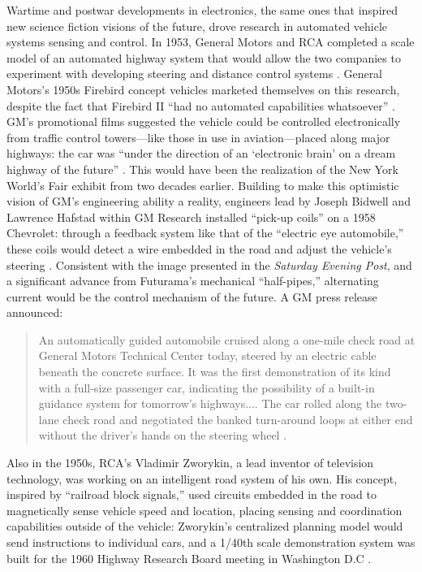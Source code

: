 Wartime and postwar developments in electronics, the same ones that
inspired new science fiction visions of the future, drove
research in automated vehicle systems sensing and control. In 1953, General
Motors and RCA completed a scale model of an automated highway system
that would allow the two companies to experiment
with developing steering and distance control systems \cite[p. 6]{wetmore}.
General Motors's 1950s Firebird concept
vehicles marketed themselves on this research, despite the fact that
Firebird II ``had no automated capabilities whatsoever'' \cite[p. 7]{wetmore}. GM's
promotional films suggested the vehicle could be controlled
electronically from traffic control towers---like those in use in
aviation---placed along major highways: the car was ``under the direction
of an `electronic brain' on a dream highway of the future'' \cite[p.
  7]{wetmore}. This 
would have been the realization of the New York World's Fair exhibit
from two decades earlier. Building to make
this optimistic vision of GM's engineering ability a reality,
engineers lead by Joseph Bidwell and Lawrence Hafstad within GM
Research installed ``pick-up coils'' on a 1958 Chevrolet: through a
feedback system like that of the ``electric eye automobile,'' these
coils would detect a wire embedded in the road and adjust the
vehicle's steering \cite[p. 7]{wetmore}. Consistent with the image presented in
the \emph{Saturday Evening Post}, and a significant advance from
Futurama's mechanical ``half-pipes,'' alternating current would
be the control mechanism of the future. A GM press release announced:
\begin{quote}
An automatically guided automobile cruised along a one-mile check road
at General Motors Technical Center today, steered by an electric cable
beneath the concrete surface. It was the first demonstration of its
kind with a full-size passenger car, indicating the possibility of a
built-in guidance system for tomorrow's highways.... The car rolled
along the two-lane check road and negotiated the banked turn-around
loops at either end without the driver's hands on the steering wheel
\cite[p. 7]{wetmore}.
\end{quote}
 Also in the 1950s, RCA's
Vladimir Zworykin, a lead inventor of television technology, was
working on an intelligent road system of his own. His concept,
inspired by ``railroad block signals,'' used circuits embedded in the
road to magnetically sense vehicle speed and location, placing sensing
and coordination capabilities outside of the vehicle:  Zworykin's
centralized planning model would send 
instructions to individual cars, and a 1/40th scale demonstration
system was built for the 1960 Highway Research Board meeting in
Washington D.C \cite[p. 9]{wetmore}.

